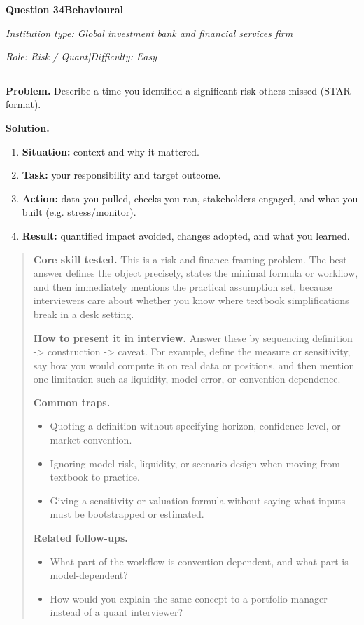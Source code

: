 \documentclass[11pt,letterpaper,openany]{book}
\newenvironment{EditorialNote}
  {\begin{quote}\small\setlength{\parskip}{0.25em}}
  {\end{quote}}
\newcommand{\InterviewQuestionHeader}[5]{%
  \vspace{1.0em}%
  {\large\bfseries #1\enspace #4\par}%
  {\small\itshape Institution type: #2\par}%
  {\small\itshape Role: #3\enspace |\enspace Difficulty: #5\par}%
  \vspace{0.25em}\hrule\vspace{0.45em}%
}
\begin{document}
\InterviewQuestionHeader{Question 34}{Global investment bank and financial services firm}{Risk / Quant}{Behavioural}{Easy}
\textbf{Problem.} Describe a time you identified a significant risk others missed (STAR format).

\textbf{Solution.}

\begin{enumerate}
\item \textbf{Situation:} context and why it mattered.
\item \textbf{Task:} your responsibility and target outcome.
\item \textbf{Action:} data you pulled, checks you ran, stakeholders engaged, and what you built (e.g. stress/monitor).
\item \textbf{Result:} quantified impact avoided, changes adopted, and what you learned.
\end{enumerate}

\begin{EditorialNote}


\textbf{Core skill tested.} This is a risk-and-finance framing problem. The best answer defines the object precisely, states the minimal formula or workflow, and then immediately mentions the practical assumption set, because interviewers care about whether you know where textbook simplifications break in a desk setting.

\textbf{How to present it in interview.} Answer these by sequencing definition -> construction -> caveat. For example, define the measure or sensitivity, say how you would compute it on real data or positions, and then mention one limitation such as liquidity, model error, or convention dependence.

\textbf{Common traps.}
\begin{itemize}
\item Quoting a definition without specifying horizon, confidence level, or market convention.
\item Ignoring model risk, liquidity, or scenario design when moving from textbook to practice.
\item Giving a sensitivity or valuation formula without saying what inputs must be bootstrapped or estimated.
\end{itemize}

\textbf{Related follow-ups.}
\begin{itemize}
\item What part of the workflow is convention-dependent, and what part is model-dependent?
\item How would you explain the same concept to a portfolio manager instead of a quant interviewer?
\end{itemize}


\end{EditorialNote}
\end{document}
